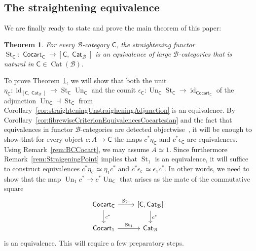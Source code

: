 \documentclass[reqno]{amsart}
\numberwithin{equation}{subsection}
\theoremstyle{plain}
\newtheorem{theorem}[equation]{Theorem}
\theoremstyle{definition}
\let\scr=\mathcal
\def\BB{\scr B}
\DeclareMathOperator{\id}{id}
\DeclareMathOperator{\Cat}{Cat}
\DeclareMathOperator{\ICat}{\mathsf{Cat}}
\DeclareMathOperator{\ICocart}{\mathsf{Cocart}}
\DeclareMathOperator{\St}{St}
\DeclareMathOperator{\Un}{Un}
\newcommand{\I}[1]{\mathsf{#1}}
\newcommand{\iFun}[2]{{[#1,#2]}}
\begin{document}
\subsection{The straightening equivalence}
\label{sec:straighteningEquivalence}
We are finally ready to state and prove the main theorem of this paper:
\begin{theorem}
	\label{thm:StraighteningEquivalence}
	For every $\BB$-category $\I{C}$, the straightening functor $\St_{\I{C}}\colon \ICocart_{\I{C}}\to\iFun{\I{C}}{\ICat_{\BB}}$ is an equivalence of large $\BB$-categories that is natural in $\I{C}\in\Cat(\BB)$.
\end{theorem}
To prove Theorem~\ref{thm:StraighteningEquivalence}, we will show that both the unit $\eta_{\I{C}}\colon \id_{\iFun{\I{C}}{\ICat_{\BB}}}\to \St_{\I{C}}\Un_{\I{C}}$ and the counit $\epsilon_{\I{C}}\colon\Un_{\I{C}}\St_{\I{C}}\to\id_{\ICocart_{\I{C}}}$ of the adjunction $\Un_{\I{C}}\dashv\St_{\I{C}}$ from Corollary~\ref{cor:straighteningUnstraigheningAdjunction} is an equivalence. By Corollary~\ref{cor:fibrewiseCriterionEquivalencesCocartesian} and the fact that equivalences in functor $\BB$-categories are detected objectwise~\cite[Corollary~4.7.17]{Martini2021}, it will be enough to show that for every object $c\colon A\to \I{C}$ the maps $c^\ast\eta_{\I{C}}$ and $c^\ast\epsilon_{\I{C}}$ are equivalences. Using Remark~\ref{rem:BCCocart}, we may assume $A\simeq 1$. Since furthermore Remark~\ref{rem:StraigeningPoint} implies that $\St_{1}$ is an equivalence, it will suffice to construct equivalences $c^\ast\eta_{\I{C}}\simeq \eta_1c^\ast$ and $c^\ast\epsilon_{\I{C}}\simeq \epsilon_{1}c^\ast$. In other words, we need to show that the  map $\Un_{1}c^\ast\to c^\ast\Un_{\I{C}}$ that arises as the mate of the commutative square
\begin{equation*}
\begin{tikzcd}
\ICocart_{\I{C}}\arrow[d, "c^\ast"]\arrow[r, "\St_{\I{C}}"] & \iFun{\I{C}}{\ICat_{\BB}}\arrow[d, "c^\ast"]\\
\ICocart_{1}\arrow[r, "\St_{1}"] & \ICat_{\BB}
\end{tikzcd}
\end{equation*}
is an equivalence. This will require a few preparatory steps.
\end{document}
